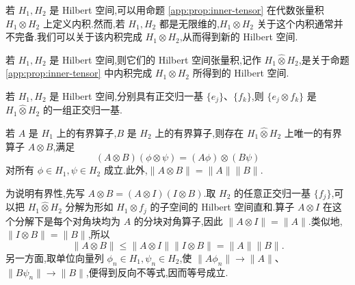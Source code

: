 若 \(H_1,H_2\) 是 Hilbert 空间,可以用命题 \ref{app:prop:inner-tensor} 在代数张量积 \(H_1\otimes H_2\) 上定义内积.然而,若 \(H_1,H_2\) 都是无限维的,\(H_1\otimes H_2\) 关于这个内积通常并不完备.我们可以关于该内积完成 \(H_1\otimes H_2\),从而得到新的 Hilbert 空间.

\begin{definition}\label{app:def:hilbert-tensor}
若 \(H_1,H_2\) 是 Hilbert 空间,则它们的 Hilbert 空间张量积,记作 \(H_1\widehat\otimes H_2\),是关于命题 \ref{app:prop:inner-tensor} 中内积完成 \(H_1\otimes H_2\) 所得到的 Hilbert 空间.
\end{definition}

\begin{proposition}[张量积中的正交归一基]\label{app:prop:hilbert-tensor-basis}
若 \(H_1,H_2\) 是 Hilbert 空间,分别具有正交归一基 \(\{e_j\}\)、\(\{f_k\}\),则 \(\{e_j\otimes f_k\}\) 是 \(H_1\widehat\otimes H_2\) 的一组正交归一基.
\end{proposition}

\begin{proposition}\label{app:prop:hilbert-operator-tensor}
若 \(A\) 是 \(H_1\) 上的有界算子,\(B\) 是 \(H_2\) 上的有界算子,则存在 \(H_1\widehat\otimes H_2\) 上唯一的有界算子 \(A\otimes B\),满足
\[
(A\otimes B)(\phi\otimes\psi)=(A\phi)\otimes(B\psi)
\]
对所有 \(\phi\in H_1,\psi\in H_2\) 成立.此外,\(\|A\otimes B\|=\|A\|\|B\|\).
\end{proposition}

为说明有界性,先写 \(A\otimes B=(A\otimes I)(I\otimes B)\).取 \(H_2\) 的任意正交归一基 \(\{f_j\}\),可以把 \(H_1\widehat\otimes H_2\) 分解为形如 \(H_1\otimes f_j\) 的子空间的 Hilbert 空间直和.算子 \(A\otimes I\) 在这个分解下是每个对角块均为 \(A\) 的分块对角算子,因此 \(\|A\otimes I\|=\|A\|\).类似地,\(\|I\otimes B\|=\|B\|\),所以
\[
\|A\otimes B\|\le\|A\otimes I\|\|I\otimes B\|=\|A\|\|B\|.
\]
另一方面,取单位向量列 \(\phi_n\in H_1,\psi_n\in H_2\),使 \(\|A\phi_n\|\to\|A\|\)、\(\|B\psi_n\|\to\|B\|\),便得到反向不等式,因而等号成立.
